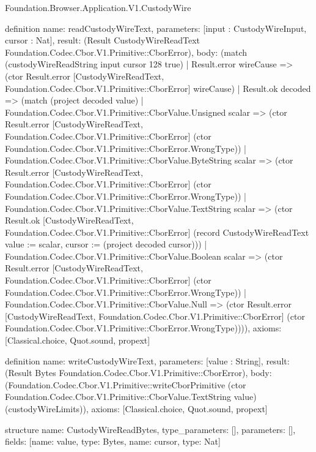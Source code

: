 \begin{lexlean}{Foundation.Browser.Application.V1.CustodyWire}
\begin{semanticmodule}
definition{
  name: readCustodyWireText,
  parameters: [input : CustodyWireInput, cursor : Nat],
  result: (Result CustodyWireReadText Foundation.Codec.Cbor.V1.Primitive::CborError),
  body: (match (custodyWireReadString input cursor 128 true)
    | Result.error wireCause => (ctor Result.error [CustodyWireReadText, Foundation.Codec.Cbor.V1.Primitive::CborError] wireCause)
    | Result.ok decoded => (match (project decoded value)
      | Foundation.Codec.Cbor.V1.Primitive::CborValue.Unsigned scalar => (ctor Result.error [CustodyWireReadText, Foundation.Codec.Cbor.V1.Primitive::CborError] (ctor Foundation.Codec.Cbor.V1.Primitive::CborError.WrongType))
      | Foundation.Codec.Cbor.V1.Primitive::CborValue.ByteString scalar => (ctor Result.error [CustodyWireReadText, Foundation.Codec.Cbor.V1.Primitive::CborError] (ctor Foundation.Codec.Cbor.V1.Primitive::CborError.WrongType))
      | Foundation.Codec.Cbor.V1.Primitive::CborValue.TextString scalar => (ctor Result.ok [CustodyWireReadText, Foundation.Codec.Cbor.V1.Primitive::CborError] (record CustodyWireReadText {value := scalar, cursor := (project decoded cursor)}))
      | Foundation.Codec.Cbor.V1.Primitive::CborValue.Boolean scalar => (ctor Result.error [CustodyWireReadText, Foundation.Codec.Cbor.V1.Primitive::CborError] (ctor Foundation.Codec.Cbor.V1.Primitive::CborError.WrongType))
      | Foundation.Codec.Cbor.V1.Primitive::CborValue.Null => (ctor Result.error [CustodyWireReadText, Foundation.Codec.Cbor.V1.Primitive::CborError] (ctor Foundation.Codec.Cbor.V1.Primitive::CborError.WrongType)))),
  axioms: [Classical.choice, Quot.sound, propext]
}

definition{
  name: writeCustodyWireText,
  parameters: [value : String],
  result: (Result Bytes Foundation.Codec.Cbor.V1.Primitive::CborError),
  body: (Foundation.Codec.Cbor.V1.Primitive::writeCborPrimitive (ctor Foundation.Codec.Cbor.V1.Primitive::CborValue.TextString value) (custodyWireLimits)),
  axioms: [Classical.choice, Quot.sound, propext]
}

structure{
  name: CustodyWireReadBytes,
  type_parameters: [],
  parameters: [],
  fields: [{name: value, type: Bytes}, {name: cursor, type: Nat}]
}


\end{semanticmodule}
\end{lexlean}
